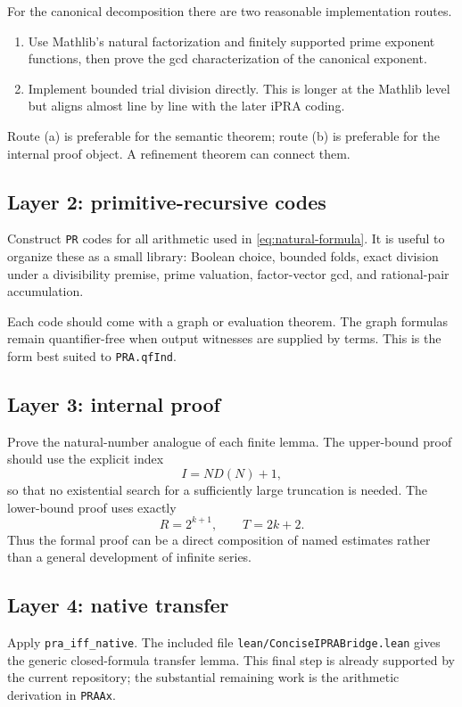 \documentclass[11pt]{article}
\theoremstyle{definition}
\begin{document}
For the canonical decomposition there are two reasonable implementation
routes.
\begin{enumerate}[label=(\alph*)]
\item Use Mathlib's natural factorization and finitely supported prime
      exponent functions, then prove the gcd characterization of the
      canonical exponent.
\item Implement bounded trial division directly.  This is longer at the
      Mathlib level but aligns almost line by line with the later iPRA coding.
\end{enumerate}
Route (a) is preferable for the semantic theorem; route (b) is preferable for
the internal proof object.  A refinement theorem can connect them.

\subsection{Layer 2: primitive-recursive codes}

Construct \texttt{PR} codes for all arithmetic used in
\eqref{eq:natural-formula}.  It is useful to organize these as a small library:
Boolean choice, bounded folds, exact division under a divisibility premise,
prime valuation, factor-vector gcd, and rational-pair accumulation.

Each code should come with a graph or evaluation theorem.  The graph formulas
remain quantifier-free when output witnesses are supplied by terms.  This is
the form best suited to \texttt{PRA.qfInd}.

\subsection{Layer 3: internal proof}

Prove the natural-number analogue of each finite lemma.  The upper-bound proof
should use the explicit index
\[
  I=N D(N)+1,
\]
so that no existential search for a sufficiently large truncation is needed.
The lower-bound proof uses exactly
\[
  R=2^{k+1},\qquad T=2k+2.
\]
Thus the formal proof can be a direct composition of named estimates rather
than a general development of infinite series.

\subsection{Layer 4: native transfer}

Apply \texttt{pra\_iff\_native}.  The included file
\texttt{lean/ConciseIPRABridge.lean} gives the generic closed-formula transfer
lemma.  This final step is already supported by the current repository; the
substantial remaining work is the arithmetic derivation in \texttt{PRAAx}.
\end{document}
